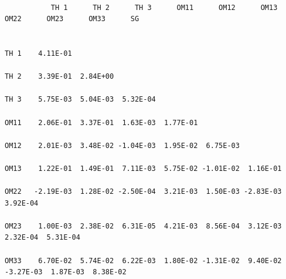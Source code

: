\documentclass[
  10pt,
]{krantz}
\begin{document}
\begin{verbatim}
                                                                                                       
           TH 1      TH 2      TH 3      OM11      OM12      OM13      OM22      OM23      OM33      SG
                                                                                                       
                                                                                                       
TH 1    4.11E-01                                                                                       
                                                                                                       
TH 2    3.39E-01  2.84E+00                                                                             
                                                                                                       
TH 3    5.75E-03  5.04E-03  5.32E-04                                                                   
                                                                                                       
OM11    2.06E-01  3.37E-01  1.63E-03  1.77E-01                                                         
                                                                                                       
OM12    2.01E-03  3.48E-02 -1.04E-03  1.95E-02  6.75E-03                                               
                                                                                                       
OM13    1.22E-01  1.49E-01  7.11E-03  5.75E-02 -1.01E-02  1.16E-01                                     
                                                                                                       
OM22   -2.19E-03  1.28E-02 -2.50E-04  3.21E-03  1.50E-03 -2.83E-03  3.92E-04                           
                                                                                                       
OM23    1.00E-03  2.38E-02  6.31E-05  4.21E-03  8.56E-04  3.12E-03  2.32E-04  5.31E-04                 
                                                                                                       
OM33    6.70E-02  5.74E-02  6.22E-03  1.80E-02 -1.31E-02  9.40E-02 -3.27E-03  1.87E-03  8.38E-02       
                                                                                                       

\end{verbatim}
\end{document}
